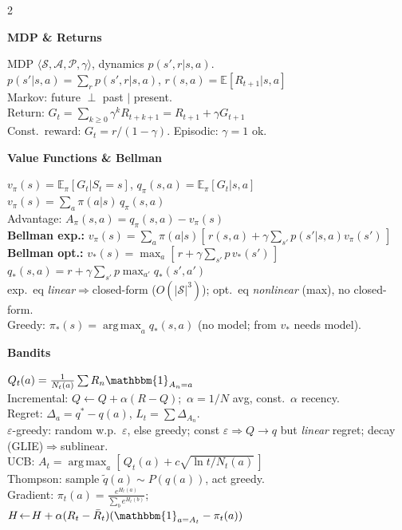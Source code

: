 \documentclass[a4paper]{article}
\newcommand{\hd}[1]{%
  \par\addvspace{3.6pt}%
  {\color{accent}\bfseries\small #1}\par
  \vspace{-4pt}{\color{accent!45}\rule{\linewidth}{0.4pt}}\par\vspace{1.2pt}}
\newcommand{\E}{\mathbb{E}}
\newcommand{\argmax}{\operatorname*{arg\,max}}
\newcommand{\Sset}{\mathcal{S}}
\newcommand{\Aset}{\mathcal{A}}
\newcommand{\ind}{\mathbbm{1}}
\begin{document}
\footnotesize

\begin{multicols}{2}

\hd{MDP \& Returns}
MDP $\langle\Sset,\Aset,\mathcal{P},\gamma\rangle$, dynamics $p(s',r|s,a)$.\\
$p(s'|s,a)=\sum_r p(s',r|s,a)$,\; $r(s,a)=\E[R_{t+1}|s,a]$\\
Markov: future $\perp$ past $\mid$ present.\\
Return: $G_t=\sum_{k\ge0}\gamma^k R_{t+k+1}=R_{t+1}+\gamma G_{t+1}$\\
Const.\ reward: $G_t=r/(1-\gamma)$. Episodic: $\gamma{=}1$ ok.

\hd{Value Functions \& Bellman}
$v_\pi(s)=\E_\pi[G_t|S_t{=}s]$,\; $q_\pi(s,a)=\E_\pi[G_t|s,a]$\\
$v_\pi(s)=\sum_a\pi(a|s)\,q_\pi(s,a)$\\
Advantage: $A_\pi(s,a)=q_\pi(s,a)-v_\pi(s)$\\
\textbf{Bellman exp.:}
$v_\pi(s)=\sum_a\pi(a|s)[\,r(s,a)+\gamma\sum_{s'}p(s'|s,a)v_\pi(s')\,]$\\
\textbf{Bellman opt.:}
$v_*(s)=\max_a[\,r+\gamma\sum_{s'}p\,v_*(s')\,]$\\
$q_*(s,a)=r+\gamma\sum_{s'}p\max_{a'}q_*(s',a')$\\
exp.\ eq \emph{linear}$\Rightarrow$closed-form ($O(|\Sset|^3)$); opt.\ eq \emph{nonlinear} (max), no closed-form.\\
Greedy: $\pi_*(s)=\argmax_a q_*(s,a)$ (no model; from $v_*$ needs model).

\hd{Bandits}
$Q_t(a)=\frac{1}{N_t(a)}\sum R_n\ind_{A_n=a}$\\
Incremental: $Q\!\leftarrow\!Q+\alpha(R-Q)$;\, $\alpha{=}1/N$ avg, const.\ $\alpha$ recency.\\
Regret: $\Delta_a=q^*-q(a)$, $L_t=\sum\Delta_{A_n}$.\\
$\varepsilon$-greedy: random w.p.\ $\varepsilon$, else greedy; const $\varepsilon{\Rightarrow}Q{\to}q$ but \emph{linear} regret; decay (GLIE)$\Rightarrow$sublinear.\\
UCB: $A_t=\argmax_a[\,Q_t(a)+c\sqrt{\ln t/N_t(a)}\,]$\\
Thompson: sample $\tilde q(a)\!\sim\!P(q(a))$, act greedy.\\
Gradient: $\pi_t(a)=\frac{e^{H_t(a)}}{\sum_b e^{H_t(b)}}$;\\
$H\!\leftarrow\!H+\alpha(R_t-\bar R_t)(\ind_{a=A_t}-\pi_t(a))$


\end{multicols}
\end{document}

